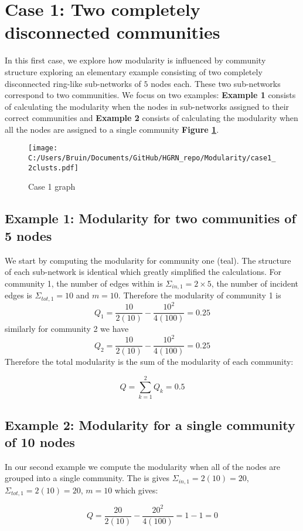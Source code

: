 \documentclass[a4paper,12pt]{article}
\begin{document}
	\section{Case 1: Two completely disconnected communities}
	In this first case, we explore how modularity is influenced by community structure exploring an elementary example consisting of two completely disconnected ring-like sub-networks of $5$ nodes each. These two sub-networks correspond to two communities. We focus on two examples: \textbf{Example 1} consists of calculating the modularity when the nodes in sub-networks assigned to their correct communities and \textbf{Example 2} consists of calculating the modularity when all the nodes are assigned to a single community \textbf{Figure \ref{fig:case1}}.
	\begin{figure}[H]
		\centering
		\caption{Case 1 graph}
		\texttt{[image: C:/Users/Bruin/Documents/GitHub/HGRN\_repo/Modularity/case1\_2clusts.pdf]}
		\label{fig:case1}
	\end{figure}
	\subsection{Example 1: Modularity for two communities of 5 nodes}
	We start by computing the modularity for community one (teal). The structure of each sub-network is identical which greatly simplified the calculations. For community 1, the number of edges within is $\Sigma_{in,1} = 2\times5$, the number of incident edges is $\Sigma_{tot,1} = 10$ and $m = 10$. Therefore the modularity of community 1 is 
	\[Q_1 = \frac{10}{2(10)} - \frac{10^2}{4(100)} = 0.25\]
	similarly for community 2 we have 
	\[Q_2 = \frac{10}{2(10)} - \frac{10^2}{4(100)} = 0.25\]
	Therefore the total modularity is the sum of the modularity of each community:
	
	\[ Q = \sum_{k=1}^2 Q_k = 0.5\]
	\subsection{Example 2: Modularity for a single community of 10 nodes}
	In our second example we compute the modularity when all of the nodes are grouped into a single community. The is gives $\Sigma_{in,1} = 2(10) = 20$, $\Sigma_{tot,1} = 2(10) = 20$,  $m = 10$ which gives:
	
	\[ Q = \frac{20}{2(10)}-\frac{20^2}{4(100)} = 1-1 = 0 \]
	
	
\end{document}

